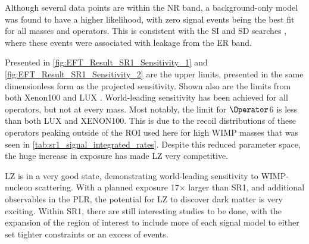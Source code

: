 


\par
Although several data points are within the NR band, a background-only model was found to have a higher likelihood, with zero signal events being the best fit for all masses and operators.
This is consistent with the SI and SD searches \cite{lz_ws_sr1_ref}, where these events were associated with leakage from the ER band.

\par
Presented in \autoref{fig:EFT_Result_SR1_Sensitivity_1} and \autoref{fig:EFT_Result_SR1_Sensitivity_2} are the upper limits, presented in the same dimensionless form as the projected sensitivity.
Shown also are the limits from both Xenon100 \cite{xenon100_eft_ref} and LUX \cite{LUX_RUN4_EFT_2021}.
World-leading sensitivity has been achieved for all operators, but not at every mass.
Most notably, the limit for $\Operator$6 is less than both LUX and XENON100.
This is due to the recoil distributions of these operators peaking outside of the ROI used here for high WIMP masses that was seen in \autoref{tab:sr1_signal_integrated_rates}.
Despite this reduced parameter space, the huge increase in exposure has made LZ very competitive.


\par
LZ is in a very good state, demonstrating world-leading sensitivity to WIMP-nucleon scattering.
With a planned exposure 17$\times$ larger than SR1, and additional observables in the PLR, the potential for LZ to discover dark matter is very exciting.
Within SR1, there are still interesting studies to be done, with the expansion of the region of interest to include more of each signal model to either set tighter constraints or an excess of events.

